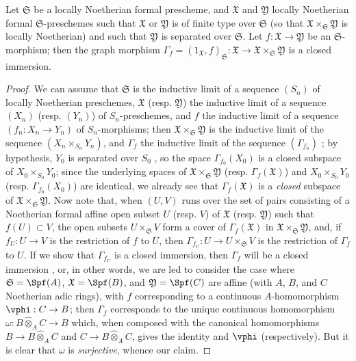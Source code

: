 \begin{proposition}[10.15.4]
\label{I.10.15.4}
Let $\mathfrak{S}$ be a locally Noetherian formal prescheme, and $\mathfrak{X}$ and $\mathfrak{Y}$ locally Noetherian formal $\mathfrak{S}$-preschemes such that $\mathfrak{X}$ or $\mathfrak{Y}$ is of finite type over $\mathfrak{S}$ (so that $\mathfrak{X}\times_\mathfrak{S}\mathfrak{Y}$ is locally Noetherian) and such that $\mathfrak{Y}$ is separated over $\mathfrak{S}$.
Let $f:\mathfrak{X}\to\mathfrak{Y}$ be an $\mathfrak{S}$-morphism; then the graph morphism $\Gamma_f=(1_\mathfrak{X},f)_\mathfrak{S}:\mathfrak{X}\to\mathfrak{X}\times_\mathfrak{S}\mathfrak{Y}$ is a closed immersion.
\end{proposition}

\begin{proof}
We can assume that $\mathfrak{S}$ is the inductive limit of a sequence $(S_n)$ of locally Noetherian preschemes, $\mathfrak{X}$ (resp. $\mathfrak{Y}$) the inductive limit of a sequence $(X_n)$ (resp. $(Y_n)$) of $S_n$-preschemes, and $f$ the inductive limit of a sequence $(f_n:X_n\to Y_n)$ of $S_n$-morphisms;
then $\mathfrak{X}\times_\mathfrak{S}\mathfrak{Y}$ is the inductive limit of the sequence $(X_n\times_{S_n}Y_n)$, and $\Gamma_f$ the inductive limit of the sequence $(\Gamma_{f_n})$ ;
by hypothesis, $Y_0$ is separated over $S_0$ , so the space $\Gamma_{f_0}(X_0)$ is a closed subspace of $X_0\times_{S_0}Y_0$;
since the underlying spaces of $\mathfrak{X}\times_\mathfrak{S}\mathfrak{Y}$ (resp. $\Gamma_f(\mathfrak{X})$) and $X_0\times_{S_0}Y_0$ (resp. $\Gamma_{f_0}(X_0)$) are identical, we already see that $\Gamma_f(\mathfrak{X})$ is a \emph{closed} subspace of $\mathfrak{X}\times_\mathfrak{S}\mathfrak{Y}$.
Now note that, when $(U,V)$ runs over the set of pairs consisting of a Noetherian formal affine open subset $U$ (resp. $V$) of $\mathfrak{X}$ (resp. $\mathfrak{Y}$) such that $f(U)\subset V$, the open subsets $U\times_\mathfrak{S} V$ form a cover of $\Gamma_f(\mathfrak{X})$ in $\mathfrak{X}\times_\mathfrak{S}\mathfrak{Y}$, and, if $f_U:U\to V$ is the restriction of $f$ to $U$, then $\Gamma_{f_U}:U\to U\times_\mathfrak{S}V$ is the restriction of $\Gamma_f$ to $U$.
If we show that $\Gamma_{f_U}$ is a closed immersion, then $\Gamma_f$ will be a closed immersion , or, in other words, we are led to consider the case where $\mathfrak{S}=\Spf(A)$, $\mathfrak{X}=\Spf(B)$, and $\mathfrak{Y}=\Spf(C)$ are affine (with $A$, $B$, and $C$ Noetherian adic rings), with $f$ corresponding to a continuous $A$-homomorphism $\vphi:C\to B$;
then $\Gamma_f$ corresponds to the unique continuous homomorphism $\omega: B\widehat{\otimes}_A C\to B$ which, when composed with the canonical homomorphisms $B\to B\widehat{\otimes}_A C$ and $C\to B\widehat{\otimes}_A C$, gives the identity and $\vphi$ (respectively).
But it is clear that $\omega$ is \emph{surjective}, whence our claim.
\end{proof}

